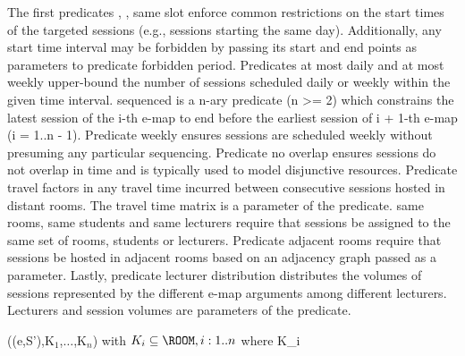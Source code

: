 The first predicates \SAMEDAILYSLOT, , same slot enforce common restrictions on the start times of the targeted sessions (e.g.,
sessions starting the same day). Additionally, any start time interval may
be forbidden by passing its start and end points as parameters to predicate
forbidden period. Predicates at most daily and at most weekly upper-bound the number of sessions scheduled daily or weekly within the given
time interval. sequenced is a n-ary predicate (n >= 2) which constrains the
latest session of the i-th e-map to end before the earliest session of i + 1-th e-map (i = 1..n - 1). Predicate weekly ensures sessions are scheduled
weekly without presuming any particular sequencing. Predicate no overlap
ensures sessions do not overlap in time and is typically used to model disjunctive resources. Predicate travel factors in any travel time incurred between
consecutive sessions hosted in distant rooms. The travel time matrix is a parameter of the predicate. same rooms, same students and same lecturers
require that sessions be assigned to the same set of rooms, students or lecturers. Predicate adjacent rooms require that sessions be hosted in adjacent
rooms based on an adjacency graph passed as a parameter. Lastly, predicate
lecturer distribution distributes the volumes of sessions represented by
the different e-map arguments among different lecturers. Lecturers and session volumes are parameters of the predicate.


\textbf{\ADJACENTROOMS}((e,S'),K$_1$,$\dots$,K$_n$) with $ K_i \subseteq \ROOM, i : 1..n $ where K\_i